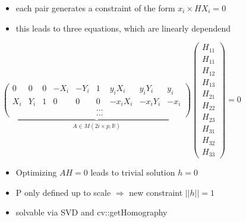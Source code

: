 \documentclass{beamer}
\begin{document}
\frame
{
\begin{itemize}
\item each pair generates a constraint of the form $x_i \times HX_i = 0 $
\item this leads to three equations, which are linearly dependend
\end{itemize}
{ \tiny
$ { \underbrace{\left(\begin{array}{ccccccccc}0 & 0 & 0 &  -X_i & -Y_i & 1 & y_iX_i & y_iY_i & y_i \\X_i & Y_i & 1 & 0 & 0  & 0 & -x_iX_i & -x_iY_i & -x_i \\ & & & & &  \ldots \\ & & & & & \ldots \end{array}\right) }_{A \in M(2i \times p,\mathbb{R}) } \left(\begin{array}{c}H_{11} \\ H_{11} \\H_{12} \\H_{13}  \\H_{21} \\H_{22} \\H_{23} \\H_{31} \\H_{32} \\H_{33}  \end{array}\right)  = 0} 	$ }


\begin{itemize}
\item Optimizing $A H = 0$ leads to trivial solution $h=0$
\item P only defined up to scale $\Rightarrow$ new constraint $||h|| = 1$
\item solvable via SVD and cv::getHomography
\end{itemize}

}
\end{document}
